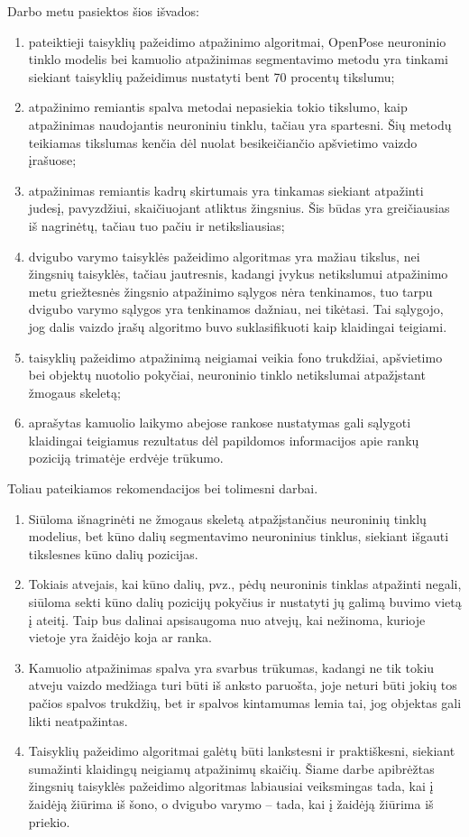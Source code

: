 \documentclass{VUMIFPSbakalaurinis}
\begin{document}

Darbo metu pasiektos šios išvados:

\begin{enumerate}
	\item pateiktieji taisyklių pažeidimo atpažinimo algoritmai, OpenPose neuroninio tinklo modelis bei kamuolio atpažinimas segmentavimo metodu yra tinkami siekiant taisyklių pažeidimus nustatyti bent 70 procentų tikslumu;
	\item atpažinimo remiantis spalva metodai nepasiekia tokio tikslumo, kaip atpažinimas naudojantis neuroniniu tinklu, tačiau yra spartesni. Šių metodų teikiamas tikslumas kenčia dėl nuolat besikeičiančio apšvietimo vaizdo įrašuose;
	\item atpažinimas remiantis kadrų skirtumais yra tinkamas siekiant atpažinti judesį, pavyzdžiui, skaičiuojant atliktus žingsnius. Šis būdas yra greičiausias iš nagrinėtų, tačiau tuo pačiu ir netiksliausias;
	\item dvigubo varymo taisyklės pažeidimo algoritmas yra mažiau tikslus, nei žingsnių taisyklės, tačiau jautresnis, kadangi įvykus netikslumui atpažinimo metu griežtesnės žingsnio atpažinimo sąlygos nėra tenkinamos, tuo tarpu dvigubo varymo sąlygos yra tenkinamos dažniau, nei tikėtasi. Tai sąlygojo, jog dalis vaizdo įrašų algoritmo buvo suklasifikuoti kaip klaidingai teigiami.
	\item taisyklių pažeidimo atpažinimą neigiamai veikia fono trukdžiai, apšvietimo bei objektų nuotolio pokyčiai, neuroninio tinklo netikslumai atpažįstant žmogaus skeletą;
	\item aprašytas kamuolio laikymo abejose rankose nustatymas gali sąlygoti klaidingai teigiamus rezultatus dėl papildomos informacijos apie rankų poziciją trimatėje erdvėje trūkumo.
\end{enumerate}

Toliau pateikiamos rekomendacijos bei tolimesni darbai.

\begin{enumerate}
	\item Siūloma išnagrinėti ne žmogaus skeletą atpažįstančius neuroninių tinklų modelius, bet kūno dalių segmentavimo neuroninius tinklus, siekiant išgauti tikslesnes kūno dalių pozicijas.
	\item Tokiais atvejais, kai kūno dalių, pvz., pėdų neuroninis tinklas atpažinti negali, siūloma sekti kūno dalių pozicijų pokyčius ir nustatyti jų galimą buvimo vietą į ateitį. Taip bus dalinai apsisaugoma nuo atvejų, kai nežinoma, kurioje vietoje yra žaidėjo koja ar ranka.
	\item Kamuolio atpažinimas spalva yra svarbus trūkumas, kadangi ne tik tokiu atveju vaizdo medžiaga turi būti iš anksto paruošta, joje neturi būti jokių tos pačios spalvos trukdžių, bet ir spalvos kintamumas lemia tai, jog objektas gali likti neatpažintas. 
	\item Taisyklių pažeidimo algoritmai galėtų būti lankstesni ir praktiškesni, siekiant sumažinti klaidingų neigiamų atpažinimų skaičių. Šiame darbe apibrėžtas žingsnių taisyklės pažeidimo algoritmas labiausiai veiksmingas tada, kai į žaidėją žiūrima iš šono, o dvigubo varymo – tada, kai į žaidėją žiūrima iš priekio. 
\end{enumerate}
\end{document}

